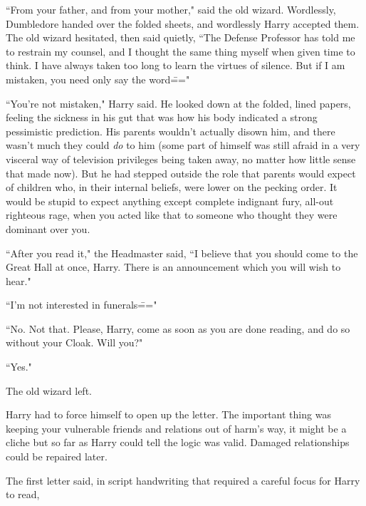 ``From your father, and from your mother," said the old wizard. Wordlessly, Dumbledore handed over the folded sheets, and wordlessly Harry accepted them. The old wizard hesitated, then said quietly, ``The Defense Professor has told me to restrain my counsel, and I thought the same thing myself when given time to think. I have always taken too long to learn the virtues of silence. But if I am mistaken, you need only say the word\==="

``You're not mistaken," Harry said. He looked down at the folded, lined papers, feeling the sickness in his gut that was how his body indicated a strong pessimistic prediction. His parents wouldn't actually disown him, and there wasn't much they could \emph{do} to him (some part of himself was still afraid in a very visceral way of television privileges being taken away, no matter how little sense that made now). But he had stepped outside the role that parents would expect of children who, in their internal beliefs, were lower on the pecking order. It would be stupid to expect anything except complete indignant fury, all-out righteous rage, when you acted like that to someone who thought they were dominant over you.

``After you read it," the Headmaster said, ``I believe that you should come to the Great Hall at once, Harry. There is an announcement which you will wish to hear."

``I'm not interested in funerals\==="

``No. Not that. Please, Harry, come as soon as you are done reading, and do so without your Cloak. Will you?"

``Yes."

The old wizard left.

Harry had to force himself to open up the letter. The important thing was keeping your vulnerable friends and relations out of harm's way, it might be a cliche but so far as Harry could tell the logic was valid. Damaged relationships could be repaired later.

The first letter said, in script handwriting that required a careful focus for Harry to read,

